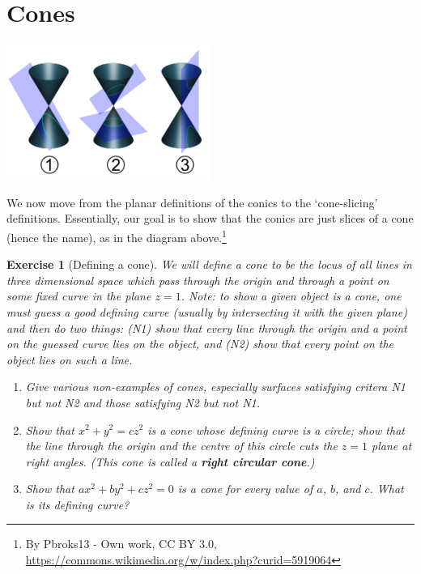 \documentclass[a4paper,leqno,10pt]{article}
\theoremstyle{exercise}
\newtheorem{Exercise}{Exercise}
\newenvironment{exercise}
  {\begin{mdframed}\begin{Exercise}}
  {\end{Exercise}\end{mdframed}}
\theoremstyle{plain}
\theoremstyle{definition}
\theoremstyle{remark}
\newcommand{\df}{\textbf}
\begin{document}
\section{Cones}
\begin{center}
  \includegraphics[width=0.5\textwidth]{slices}
\end{center}
We now move from the planar definitions of the conics to the `cone-slicing' definitions. Essentially, our goal
is to show that the conics are just slices of a cone (hence the name), as in the diagram above.\footnote{By Pbroks13 - Own work, CC BY 3.0, \url{https://commons.wikimedia.org/w/index.php?curid=5919064}}

\begin{exercise}[Defining a cone]
  We will define a cone to be the locus of all lines in three dimensional space which pass through the origin and through a point on some
  fixed curve in the plane $ z = 1 $. Note: to show a given object is a cone, one must guess a good defining curve (usually by intersecting
  it with the given plane) and then do two things: (N1) show that every line through the origin and a point on the guessed curve lies on the
  object, and (N2) show that every point on the object lies on such a line.
  \begin{enumerate}
    \item Give various non-examples of cones, especially surfaces satisfying critera N1 but not N2 and those satisfying N2 but not N1.
    \item Show that $ x^2 + y^2 = cz^2 $ is a cone whose defining curve is a circle; show that the line through the origin and the centre
          of this circle cuts the $ z = 1 $ plane at right angles. (This cone is called a \df{right circular cone}.)
    \item Show that $ ax^2 + by^2 + cz^2 = 0 $ is a cone for every value of $ a $, $ b $, and $ c $. What is its defining curve?
  \end{enumerate}
\end{exercise}
\end{document}
